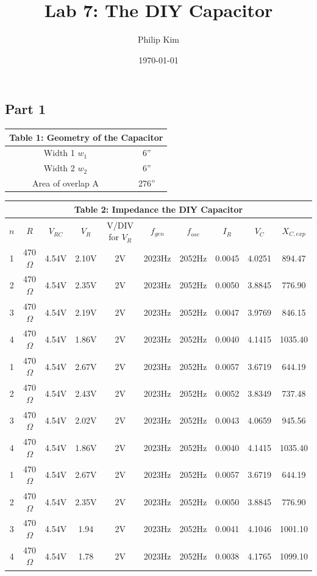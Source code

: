 \documentclass{article}
\title{Lab 7: The DIY Capacitor}
\author{Philip Kim}
\date{\today}
\begin{document}
\maketitle
\vspace*{-1cm}
\begin{table}[!htp]\centering
\subsection*{Part 1}
\begin{tabular}{|c|c|}\hline
  \multicolumn{2}{|c|}{\textbf{Table 1: Geometry of the Capacitor}} \\\hline
  Width 1 \(w_1\) & 6'' \\\hline
  Width 2 \(w_2\) & 6'' \\\hline
  Area of overlap A & 276'' \\\hline
  \end{tabular}
\end{table}

\begin{table}[!htp]\centering
  \begin{tabular}{|c|c|c|c|c|c|c|c|c|c|}\hline
    \multicolumn{10}{|c|}{\textbf{Table 2: Impedance the DIY Capacitor}} \\\hline
    \(n\) & \(R\) & \(V_{RC}\) & \(V_R\) & V/DIV for \(V_R\) & \(f_{gen}\) & \(f_{osc}\) & \(I_R\) & \(V_C\) & \(X_{C,exp}\) \\\hline
    1 & 470\(\Omega \) & 4.54V & 2.10V & 2V & 2023Hz & 2052Hz & 0.0045 & 4.0251 & 894.47 \\\hline
    2 & 470\(\Omega \) & 4.54V & 2.35V & 2V & 2023Hz & 2052Hz & 0.0050 & 3.8845 & 776.90 \\\hline
    3 & 470\(\Omega \) & 4.54V & 2.19V & 2V & 2023Hz & 2052Hz & 0.0047 & 3.9769 & 846.15 \\\hline
    4 & 470\(\Omega \) & 4.54V & 1.86V & 2V & 2023Hz & 2052Hz & 0.0040 & 4.1415 & 1035.40 \\\hline
    1 & 470\(\Omega \) & 4.54V & 2.67V & 2V & 2023Hz & 2052Hz & 0.0057 & 3.6719 & 644.19 \\\hline
    2 & 470\(\Omega \) & 4.54V & 2.43V & 2V & 2023Hz & 2052Hz & 0.0052 & 3.8349 & 737.48 \\\hline
    3 & 470\(\Omega \) & 4.54V & 2.02V & 2V & 2023Hz & 2052Hz & 0.0043 & 4.0659 & 945.56 \\\hline
    4 & 470\(\Omega \) & 4.54V & 1.86V & 2V & 2023Hz & 2052Hz & 0.0040 & 4.1415 & 1035.40 \\\hline
    1 & 470\(\Omega \) & 4.54V & 2.67V & 2V & 2023Hz & 2052Hz & 0.0057 & 3.6719 & 644.19 \\\hline
    2 & 470\(\Omega \) & 4.54V & 2.35V & 2V & 2023Hz & 2052Hz & 0.0050 & 3.8845 & 776.90 \\\hline
    3 & 470\(\Omega \) & 4.54V & 1.94 & 2V & 2023Hz & 2052Hz & 0.0041 & 4.1046 & 1001.10 \\\hline
    4 & 470\(\Omega \) & 4.54V & 1.78 & 2V & 2023Hz & 2052Hz & 0.0038 & 4.1765 & 1099.10 \\\hline
  \end{tabular}
\end{table}
\end{document}
